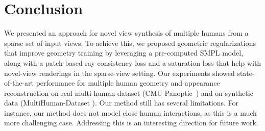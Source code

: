 
\section{Conclusion}
\label{sec:conclusion}
We presented an approach for novel view synthesis of multiple humans from a sparse set of input views. To achieve this, we proposed geometric regularizations that improve geometry training by leveraging a pre-computed SMPL model, along with a patch-based ray consistency loss and a saturation loss that help with novel-view renderings in the sparse-view setting. Our experiments showed state-of-the-art performance for multiple human geometry and appearance reconstruction on real multi-human dataset (CMU Panoptic~\cite{Simon_2017_CVPR,Joo_2017_TPAMI}) and on synthetic data (MultiHuman-Dataset \cite{zheng2021deepmulticap}). Our method still has several limitations. For instance, our method does not model close human interactions, as this is a much more challenging case. Addressing this is an interesting direction for future work.






